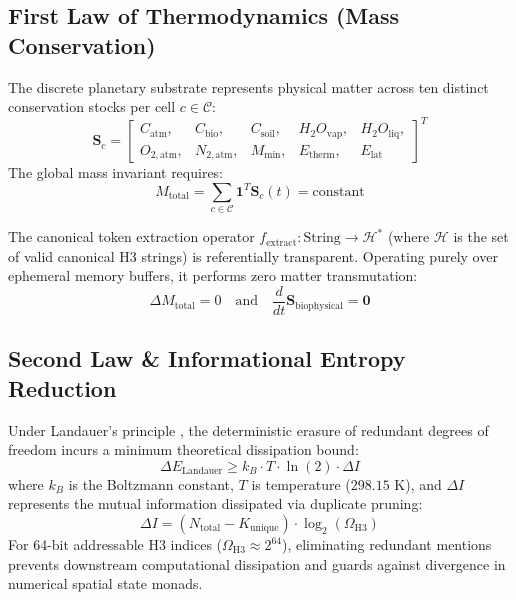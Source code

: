 \documentclass[10pt,journal,compsoc]{IEEEtran}
\begin{document}
\subsection{First Law of Thermodynamics (Mass Conservation)}
The discrete planetary substrate represents physical matter across ten distinct conservation stocks per cell $c \in \mathcal{C}$:
\begin{equation}
    \mathbf{S}_c = \begin{bmatrix}
    C_{\text{atm}}, & C_{\text{bio}}, & C_{\text{soil}}, & H_2O_{\text{vap}}, & H_2O_{\text{liq}}, \\
    O_{2,\text{atm}}, & N_{2,\text{atm}}, & M_{\text{min}}, & E_{\text{therm}}, & E_{\text{lat}}
    \end{bmatrix}^T
\end{equation}
The global mass invariant requires:
\begin{equation}
    M_{\text{total}} = \sum_{c \in \mathcal{C}} \mathbf{1}^T \mathbf{S}_c(t) = \text{constant}
\end{equation}

The canonical token extraction operator $f_{\text{extract}}: \text{String} \to \mathcal{H}^*$ (where $\mathcal{H}$ is the set of valid canonical H3 strings) is referentially transparent. Operating purely over ephemeral memory buffers, it performs zero matter transmutation:
\begin{equation}
    \Delta M_{\text{total}} = 0 \quad \text{and} \quad \frac{d}{dt}\mathbf{S}_{\text{biophysical}} = \mathbf{0}
\end{equation}

\subsection{Second Law \& Informational Entropy Reduction}
Under Landauer's principle \cite{landauer1961irreversibility}, the deterministic erasure of redundant degrees of freedom incurs a minimum theoretical dissipation bound:
\begin{equation}
    \Delta E_{\text{Landauer}} \ge k_B \cdot T \cdot \ln(2) \cdot \Delta I
\end{equation}
where $k_B$ is the Boltzmann constant, $T$ is temperature ($298.15\text{ K}$), and $\Delta I$ represents the mutual information dissipated via duplicate pruning:
\begin{equation}
    \Delta I = (N_{\text{total}} - K_{\text{unique}}) \cdot \log_2(\Omega_{\text{H3}})
\end{equation}
For 64-bit addressable H3 indices ($\Omega_{\text{H3}} \approx 2^{64}$), eliminating redundant mentions prevents downstream computational dissipation and guards against divergence in numerical spatial state monads.
\end{document}
